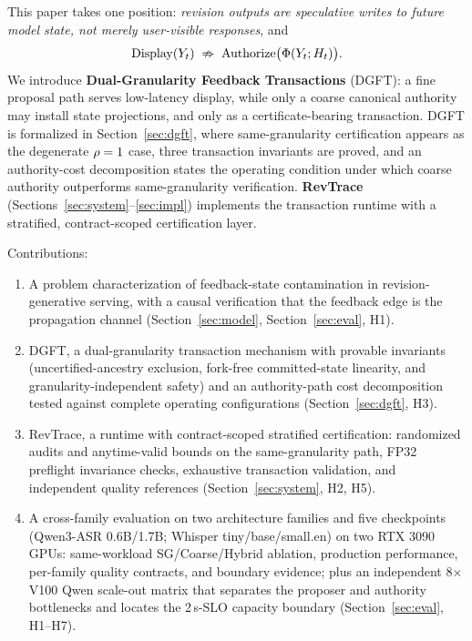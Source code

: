 This paper takes one position: \emph{revision outputs are speculative writes
to future model state, not merely user-visible responses}, and
\[
\mathrm{Display}(Y_t)\;\nRightarrow\;\mathrm{Authorize}\bigl(\Phi(Y_t;H_t)\bigr).
\]
We introduce \textbf{Dual-Granularity Feedback Transactions} (DGFT): a fine
proposal path serves low-latency display, while only a coarse canonical
authority may install state projections, and only as a certificate-bearing
transaction. DGFT is formalized in Section~\ref{sec:dgft}, where
same-granularity certification appears as the degenerate $\rho=1$ case,
three transaction invariants are proved, and an authority-cost decomposition
states the operating condition under which coarse authority outperforms
same-granularity verification.
\textbf{RevTrace} (Sections~\ref{sec:system}--\ref{sec:impl}) implements the
transaction runtime with a stratified, contract-scoped certification layer.

Contributions:
\begin{enumerate}
  \item A problem characterization of feedback-state contamination in
    revision-generative serving, with a causal verification that the feedback
    edge is the propagation channel (Section~\ref{sec:model},
    Section~\ref{sec:eval}, H1).
  \item DGFT, a dual-granularity transaction mechanism with provable
    invariants (uncertified-ancestry exclusion, fork-free committed-state
    linearity, and granularity-independent safety) and an authority-path cost
    decomposition tested against complete operating configurations
    (Section~\ref{sec:dgft}, H3).
  \item RevTrace, a runtime with contract-scoped stratified certification:
    randomized audits and anytime-valid bounds on the same-granularity path,
    FP32 preflight invariance checks, exhaustive transaction validation, and
    independent quality references (Section~\ref{sec:system}, H2, H5).
  \item A cross-family evaluation on two architecture families and five
    checkpoints (Qwen3-ASR 0.6B/1.7B; Whisper tiny/base/small.en) on two
    RTX 3090 GPUs: same-workload SG/Coarse/Hybrid ablation, production
    performance, per-family quality contracts, and boundary evidence; plus an
    independent 8$\times$V100 Qwen scale-out matrix that separates the
    proposer and authority bottlenecks and locates the 2\,s-SLO capacity
    boundary (Section~\ref{sec:eval}, H1--H7).
\end{enumerate}
